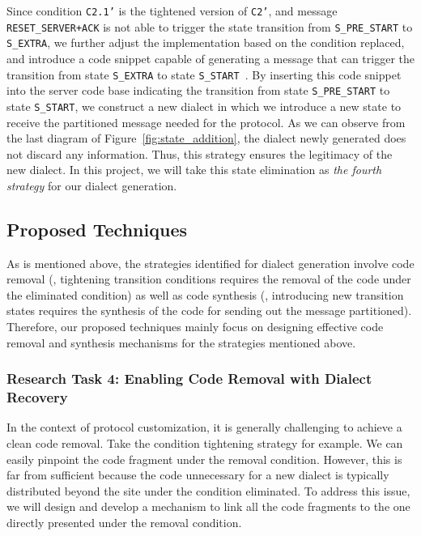{{Since condition \texttt{C2.1'} is the tightened version of \texttt{C2'}, and
message \texttt{RESET\_SERVER+ACK} is not able to trigger the state transition
from \texttt{S\_PRE\_START} to \texttt{S\_EXTRA}, we further adjust the
implementation based on the condition replaced, and introduce a code snippet
capable of generating a message that can trigger the transition from state
\texttt{S\_EXTRA} to state \texttt{S\_START }. By inserting this code snippet
into the server code base indicating the transition from state
\texttt{S\_PRE\_START} to state \texttt{S\_START}, we construct a new dialect in
which we introduce a new state to receive the partitioned message needed for the
protocol. As we can observe from the last diagram of
Figure~\ref{fig:state_addition}, the dialect newly generated does not discard
any information. Thus, this strategy ensures the  legitimacy of the new dialect.
In this project, we will take this state elimination as \emph{the fourth
strategy} for our dialect generation.

\subsection{Proposed Techniques}

As is mentioned above, the strategies identified for dialect generation involve
code removal (\eg, tightening transition conditions requires the removal of the
code under the eliminated condition) as well as code synthesis (\eg, introducing
new transition states requires the synthesis of the code for sending out the
message partitioned). Therefore, our proposed techniques mainly focus on
designing effective code removal and synthesis mechanisms for the strategies
mentioned above.

\subsubsection{Research Task 4: Enabling Code Removal with Dialect Recovery}

In the context of protocol customization, it is generally challenging to achieve
a clean code removal. Take the condition tightening strategy for example. We can
easily pinpoint the code fragment under the removal condition. However, this is
far from sufficient because the code unnecessary for a new dialect is typically
distributed beyond the site under the condition eliminated. To address this
issue, we will design and develop a mechanism to link all the code fragments to
the one directly presented under the removal condition.

}}
